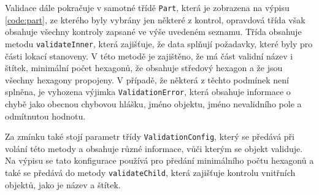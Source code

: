 Validace dále pokračuje v samotné třídě \texttt{Part}, která je zobrazena na výpisu \ref{code:part}, ze kterého byly vybrány jen některé z kontrol, opravdová třída však obsahuje všechny kontroly zapsané ve výše uvedeném seznamu. Třída obsahuje metodu \texttt{validateInner}, která zajišťuje, že data splňují požadavky, které byly pro části lokací stanoveny. V této metodě je zajištěno, že má část validní název i štítek, minimální počet hexagonů, že obsahuje středový hexagon a že jsou všechny hexagony propojeny. V případě, že některá z těchto podmínek není splněna, je vyhozena výjimka \texttt{ValidationError}, která obsahuje informace o chybě jako obecnou chybovou hlášku, jméno objektu, jméno nevalidního pole a odmítnutou hodnotu.

Za zmínku také stojí parametr třídy  \texttt{ValidationConfig}, který se předává při volání této metody a obsahuje různé informace, vůči kterým se objekt validuje. Na výpisu se tato konfigurace používá pro předání minimálního počtu hexagonů a také se předává do metody \texttt{validateChild}, která zajišťuje kontrolu vnitřních objektů, jako je název a štítek.

